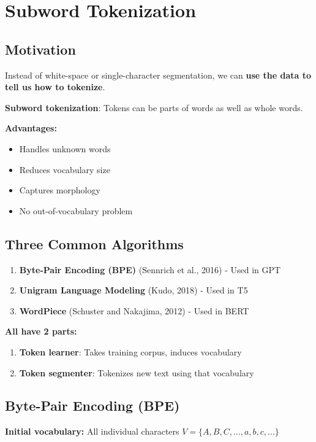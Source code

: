 \documentclass[11pt,a4paper]{article}
\theoremstyle{definition}
\theoremstyle{plain}
\theoremstyle{remark}
\begin{document}
\section{Subword Tokenization}

\subsection{Motivation}

Instead of white-space or single-character segmentation, we can \textbf{use the data to tell us how to tokenize}.

\textbf{Subword tokenization}: Tokens can be parts of words as well as whole words.

\textbf{Advantages:}
\begin{itemize}
    \item Handles unknown words
    \item Reduces vocabulary size
    \item Captures morphology
    \item No out-of-vocabulary problem
\end{itemize}

\subsection{Three Common Algorithms}

\begin{enumerate}
    \item \textbf{Byte-Pair Encoding (BPE)} (Sennrich et al., 2016) - Used in GPT
    \item \textbf{Unigram Language Modeling} (Kudo, 2018) - Used in T5
    \item \textbf{WordPiece} (Schuster and Nakajima, 2012) - Used in BERT
\end{enumerate}

\textbf{All have 2 parts:}
\begin{enumerate}
    \item \textbf{Token learner}: Takes training corpus, induces vocabulary
    \item \textbf{Token segmenter}: Tokenizes new text using that vocabulary
\end{enumerate}

\subsection{Byte-Pair Encoding (BPE)}

\textbf{Initial vocabulary:} All individual characters $V = \{A, B, C, \ldots, a, b, c, \ldots\}$
\end{document}
